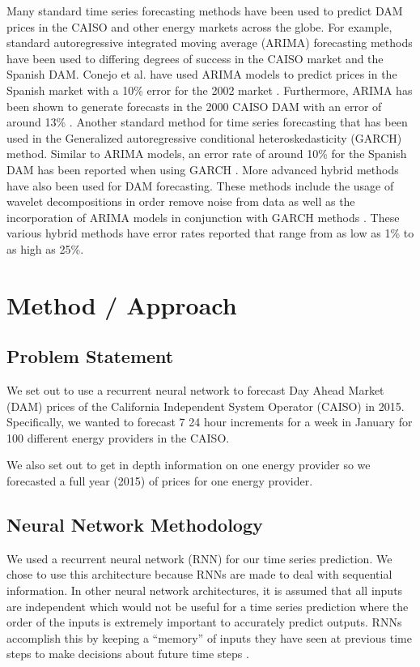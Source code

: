 \documentclass[sigconf]{acmart}
\begin{document}
Many standard time series forecasting methods have been used to predict DAM prices in the CAISO and other energy markets across the globe. For example, standard autoregressive integrated moving average (ARIMA) forecasting methods have been used to differing degrees of success in the CAISO market and the Spanish DAM. Conejo et al. have used ARIMA models to predict prices in the Spanish market with a 10\% error for the 2002 market \cite{Conejo2005a}. Furthermore, ARIMA has been shown to generate forecasts in the 2000 CAISO DAM with an error of around 13\% \cite{Garcia2005}. Another standard method for time series forecasting that has been used in the  Generalized autoregressive conditional heteroskedasticity (GARCH) method. Similar to ARIMA models, an error rate of around 10\% for the Spanish DAM has been reported when using GARCH \cite{Garcia2005}. More advanced hybrid methods have also been used for DAM forecasting. These methods include the usage of wavelet decompositions in order remove noise from data as well as the incorporation of ARIMA models in conjunction with GARCH methods \cite{Conejo2005,Tan2010,Amjady2008,Wang2012}. These various hybrid methods have error rates reported that range from as low as 1\% to as high as 25\%. 


\section{Method / Approach}
\label{sec:approach}

\subsection{Problem Statement}
We set out to use a recurrent neural network to forecast Day Ahead Market (DAM) prices of the California Independent System Operator (CAISO)  in 2015. Specifically, we wanted to forecast 7 24 hour increments for a week in January for 100 different energy providers in the CAISO. 

We also set out to get in depth information on one energy provider so we forecasted a full year (2015) of prices for one energy provider.

\subsection{Neural Network Methodology}
We used a recurrent neural network (RNN) for our time series prediction. We chose to use this architecture because RNNs are made to deal with sequential information. In other neural network architectures, it is assumed that all inputs are independent which would not be useful for a time series prediction where the order of the inputs is extremely important to accurately predict outputs. RNNs accomplish this by keeping a “memory” of inputs they have seen at previous time steps to make decisions about future time steps \cite{Dasgupta2018}.  
\end{document}
